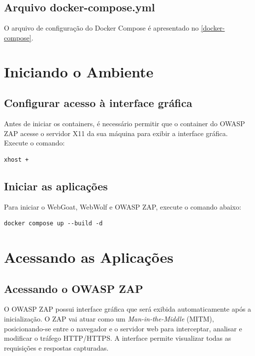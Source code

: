 \documentclass[11pt]{ifscarticle}
\begin{document}
\subsection{Arquivo docker-compose.yml}

O arquivo de configuração do Docker Compose é apresentado no \autoref{docker-compose}.



\section{Iniciando o Ambiente}

\subsection{Configurar acesso à interface gráfica}

Antes de iniciar os containers, é necessário permitir que o container do OWASP ZAP acesse o servidor X11 da sua máquina para exibir a interface gráfica. Execute o comando:

\begin{lstlisting}[style=shell]
xhost +
\end{lstlisting}

\subsection{Iniciar as aplicações}

Para iniciar o WebGoat, WebWolf e OWASP ZAP, execute o comando abaixo:

\begin{lstlisting}[style=shell]
docker compose up --build -d
\end{lstlisting}

\section{Acessando as Aplicações}

\subsection{Acessando o OWASP ZAP}

O OWASP ZAP possui interface gráfica que será exibida automaticamente após a inicialização. O ZAP vai atuar como um \textit{Man-in-the-Middle} (MITM), posicionando-se entre o navegador e o servidor web para interceptar, analisar e modificar o tráfego HTTP/HTTPS. A interface permite visualizar todas as requisições e respostas capturadas.
\end{document}
